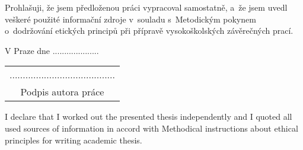 \startDeclaration
\ifCzech
  Prohlašuji, že jsem předloženou práci vypracoval samostatně,
  a~že jsem uvedl veškeré použité informační zdroje v~souladu
  s~Metodickým pokynem o~dodržování etických principů při přípravě
  vysokoškolských závěrečných prací.														

\vspace{5mm}V Praze dne ....................\hfill  
    \begin{tabular}{c}                            
    ........................................\\      
    Podpis autora práce                                         
    \end{tabular}                                  
\fi
\ifEnglish
  I declare that I worked out the presented thesis independently
  and I quoted all used sources of information in accord with
  Methodical instructions about ethical principles for writing
  academic thesis.
\fi
\stopDeclaration

\endinput
